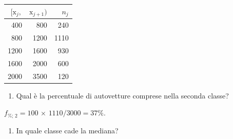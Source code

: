 \documentclass[
  11pt,
]{book}
\providecommand{\tightlist}{%
  \setlength{\itemsep}{0pt}\setlength{\parskip}{0pt}}
\theoremstyle{mytheoremstyle}
\theoremstyle{mydefstyle}
\newenvironment{sol}
  {
  \begin{tcolorbox}[enhanced,breakable,arc=0.1mm,boxrule=1pt,colback=white,colframe=iblue,
  title=\bf \fontfamily{lmss}\selectfont \hspace{.5 cm} Soluzione,drop fuzzy shadow]

}{
\end{tcolorbox}
  }
\begin{document}
\begin{tabular}{rrr}
\toprule
$[\text{x}_j,$ & $\text{x}_{j+1})$ & $n_j$\\
\midrule
400 & 800 & 240\\
800 & 1200 & 1110\\
1200 & 1600 & 930\\
1600 & 2000 & 600\\
2000 & 3500 & 120\\
\bottomrule
\end{tabular}

\begin{enumerate}
\def\labelenumi{\alph{enumi}.}
\tightlist
\item
  Qual è la percentuale di autovetture comprese nella seconda classe?
\end{enumerate}

\begin{sol}
\(f_{\%;\, 2} = 100 \,\times\, 1110/3000 = 37\%\).

\end{sol}

\begin{enumerate}
\def\labelenumi{\alph{enumi}.}
\setcounter{enumi}{1}
\tightlist
\item
  In quale classe cade la mediana?
\end{enumerate}
\end{document}

